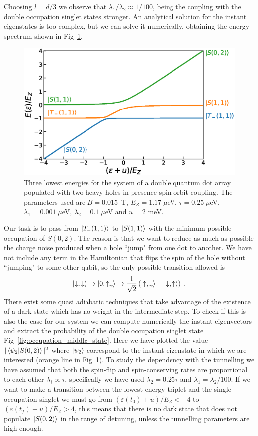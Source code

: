 \documentclass[a4paper,11pt]{article}
\begin{document}
Choosing $l=d/3$ we observe that $\lambda_1/\lambda_2\approx 1/100$, being the coupling with the double occupation singlet states stronger. An analytical solution for the instant eigenstates is too complex, but we can solve it numerically, obtaining the energy spectrum shown in Fig~\ref{fig:eigenenergies_2QD_2HH_w_SOC}.
\begin{figure}[!htbp]
	\centering
	\includegraphics[width=0.8\linewidth]{eigenenergies_2QD_2HH_w_SOC.eps}
	\caption{Three lowest energies for the system of a double quantum dot array populated with two heavy holes in presence spin orbit coupling. The parameters used are $B=0.015$~T, $E_Z=1.17\; \mu$eV, $\tau=0.25\; \mu$eV, $\lambda_1=0.001\; \mu$eV, $\lambda_2=0.1\; \mu$eV and $u=2$ meV.}
	\label{fig:eigenenergies_2QD_2HH_w_SOC}
\end{figure}
Our task is to pass from $\ket{T_-(1,1)}$ to $\ket{S(1,1)}$ with the minimum possible occupation of $S(0,2)$. The reason is that we want to reduce as much as possible the charge noise produced when a hole ``jump" from one dot to another. We have not include any term in the Hamiltonian that flips the spin of the hole without ``jumping" to some other qubit, so the only possible transition allowed is
\begin{equation}
	\ket{\downarrow,\downarrow}\rightarrow \ket{0,\uparrow\downarrow} \rightarrow \frac{1}{\sqrt{2}}\left(\ket{\uparrow,\downarrow}-\ket{\downarrow,\uparrow}\right)\; .
\end{equation}
There exist some quasi adiabatic techniques that take advantage of the existence of a dark-state which has no weight in the intermediate step. To check if this is also the case for our system we can compute numerically the instant eigenvectors and extract the probability of the double occupation singlet state Fig~\ref{fig:occupation_middle_state}. Here we have plotted the value $|\braket{\psi_2}{S(0,2)}|^2$ where $\ket{\psi_2}$ correspond to the instant eigenstate in which we are interested (orange line in Fig~\ref{fig:eigenenergies_2QD_2HH_w_SOC}). To study the dependency with the tunnelling we have assumed that both the spin-flip and spin-conserving rates are proportional to each other $\lambda_i\propto \tau$, specifically we have used $\lambda_2=0.25\tau$ and $\lambda_1=\lambda_2/100$. If we want to make a transition between the lowest energy triplet and the single occupation singlet we must go from $(\varepsilon(t_0)+u)/E_Z<-4$ to $(\varepsilon(t_f)+u)/E_Z>4$, this means that there is no dark state that does not populate $\ket{S(0,2)}$ in the range of detuning, unless the tunnelling parameters are high enough.
\end{document}
